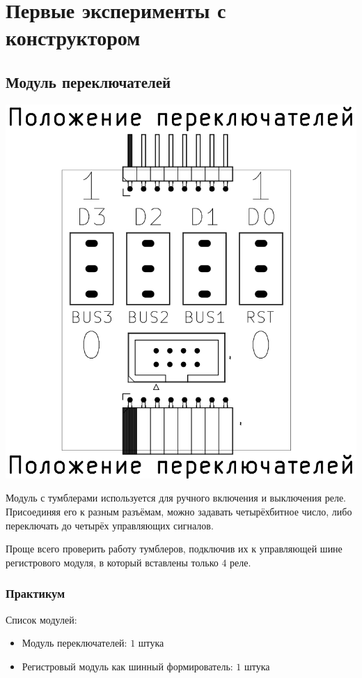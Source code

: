 \chapter{Первые эксперименты с конструктором}


\section{Модуль переключателей}

\begin{center}
\includegraphics{boards/switches.png}
\end{center}

Модуль с тумблерами используется для ручного включения и выключения реле.
Присоединяя его к разным разъёмам, можно задавать четырёхбитное число,
либо переключать до четырёх управляющих сигналов.

Проще всего проверить работу тумблеров, подключив их к управляющей шине
регистрового модуля, в который вставлены только $4$ реле.

\subsection{Практикум}


Список модулей:
\begin{itemize}
    \item Модуль переключателей: $1$ штука
    \item Регистровый модуль как шинный формирователь: $1$ штука
\end{itemize}

